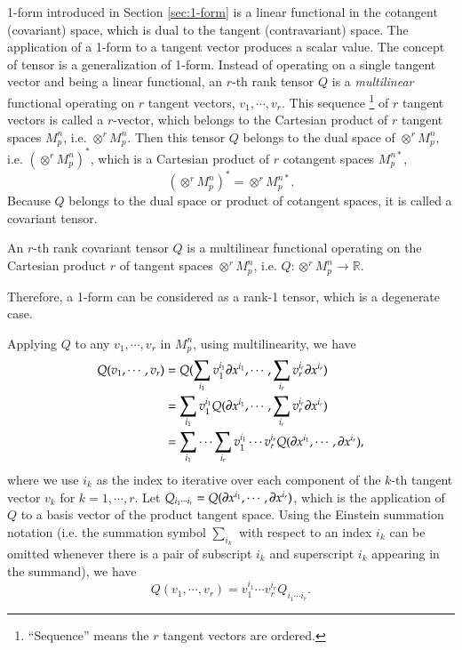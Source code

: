\documentclass[11pt, a4paper]{book}
\begin{document}
1-form introduced in Section \ref{sec:1-form} is a linear functional in the cotangent
(covariant) space, which is dual to the tangent (contravariant) space. The application of
a 1-form to a tangent vector produces a scalar value. The concept of tensor is a
generalization of 1-form. Instead of operating on a single tangent vector and being a
linear functional, an $r$-th rank tensor $Q$ is a \emph{multilinear} functional operating
on $r$ tangent vectors, $v_1, \cdots, v_r$. This sequence \footnote{``Sequence'' means the
  $r$ tangent vectors are ordered.} of $r$ tangent vectors is called a $r$-vector, which
belongs to the Cartesian product of $r$ tangent spaces $M_p^n$, i.e. $\otimes^r M_p^n$.
Then this tensor $Q$ belongs to the dual space of $\otimes^r M_p^n$, i.e.
$\left( \otimes^r M_p^n \right)^*$, which is a Cartesian product of $r$ cotangent spaces
$M_p^{n*}$,
\begin{equation}
  \left( \otimes^r M_p^n \right)^* = \otimes^r M_p^{n*}.
\end{equation}
Because $Q$ belongs to the dual space or product of cotangent spaces, it is called a
covariant tensor.

\begin{Definition}
  An $r$-th rank covariant tensor $Q$ is a multilinear functional operating on the
  Cartesian product $r$ of tangent spaces $\otimes^r M_p^n$, i.e.
  $Q: \otimes^r M_p^n \rightarrow \mathbb{R}$.
\end{Definition}
Therefore, a 1-form can be considered as a rank-1 tensor, which is a degenerate case.

Applying $Q$ to any $v_1, \cdots, v_r$ in $M_p^n$, using multilinearity, we have
\begin{equation}
  \label{eq:covariant-tensor-applied-to-r-vectors-expanded}
  \begin{aligned}
    Q(v_1,\cdots,v_r) &= Q(\sum_{i_1}v_1^{i_1} \boldsymbol{\partial}x^{i_1}, \cdots,
    \sum_{i_r}v_r^{i_r} \boldsymbol{\partial}x^{i_r}) \\
    &= \sum_{i_1}v_1^{i_1} Q(\boldsymbol{\partial}x^{i_1},\cdots,\sum_{i_r}v_r^{i_r}\boldsymbol{\partial}x^{i_r}) \\
    &= \sum_{i_1}\cdots\sum_{i_r}v_1^{i_1}\cdots v_r^{i_r}
    Q(\boldsymbol{\partial}x^{i_1},\cdots,\boldsymbol{\partial}x^{i_r}),
  \end{aligned}
\end{equation}
where we use $i_k$ as the index to iterative over each component of the $k$-th tangent
vector $v_k$ for $k=1,\cdots,r$. Let
$Q_{i_1\cdots i_r}= Q(\boldsymbol{\partial}x^{i_1},\cdots,\boldsymbol{\partial}x^{i_r})$, which is the
application of $Q$ to a basis vector of the product tangent space. Using the Einstein
summation notation (i.e. the summation symbol $\sum_{i_k}$ with respect to an index $i_k$
can be omitted whenever there is a pair of subscript $i_k$ and superscript $i_k$ appearing
in the summand), we have
\begin{equation}
  \label{eq:covariant-tensor-applied-to-r-vectors}
  Q(v_1,\cdots,v_r) = v_1^{i_1}\cdots v_r^{i_r} Q_{i_1 \cdots i_r}.
\end{equation}
\end{document}
